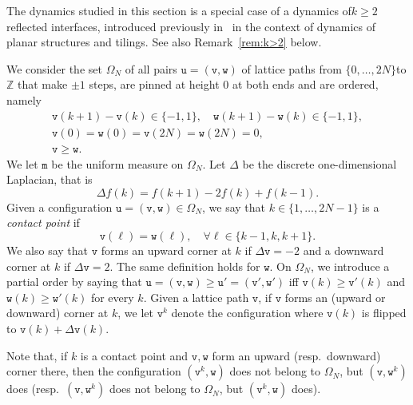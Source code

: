 \documentclass[AHL,Unicode,longabstracts]{cedram}
\theoremstyle{plain}
\newcommand{\ttv}{\mathtt{v}}
\newcommand{\ttw}{\mathtt{w}}
\newcommand{\ttu}{\mathtt{u}}
\newcommand{\ttm}{\mathtt{m}}
\newcommand{\tu}{\mathtt{u}}
\newcommand{\bbZ}{\mathbb{Z}}
\let\oldforall\forall
\renewcommand*{\forall}{\mathrel{\oldforall}}
\newcounter{setofstep}
\newcounter{step}[setofstep]
\begin{document}
The dynamics studied in this section is a special case of a dynamics of\linebreak $k\ge 2$ reflected interfaces, introduced previously in~\cite{luby2001markov,wilson2004mixing} in the context of dynamics of planar structures and tilings. See also Remark~\ref{rem:k>2} below.

We consider the set $\Omega_N$ of all pairs $\ttu=(\ttv,\ttw)$ of lattice paths from $\{0,\dots,2N\}$\linebreak to $\bbZ$ that make $\pm 1$ steps, are pinned at height $0$ at both ends and are ordered, namely
\begin{gather*}
\ttv(k+1)-\ttv(k) \in \{-1,1\},\quad \ttw(k+1)-\ttw(k) \in \{-1,1\},\\
\ttv(0)=\ttw(0)=\ttv(2N)=\ttw(2N) = 0,\\
\ttv \ge \ttw.
\end{gather*}
We let $\ttm$ be the uniform measure on $\Omega_N$. Let $\Delta$ be the discrete one-dimensional Laplacian, that is
\[
\Delta f(k) = f(k+1) - 2 f(k) + f(k-1).
\]
Given a configuration $\tu=(\ttv,\ttw) \in \Omega_N$, we say that $k\in\{1,\dots,2N-1\}$ is a \emph{contact point} if
\[
\ttv(\ell) = \ttw(\ell),\quad \forall \ell \in \{k-1,k,k+1\}.
\]
We also say that $\ttv$ forms an upward corner at $k$ if $\Delta \ttv = -2$ and a downward corner at $k$ if $\Delta \ttv = 2$. The same definition holds for $\ttw$. On $\Omega_N$, we introduce a partial order by saying that $\ttu=(\ttv,\ttw)\ge \ttu'=(\ttv',\ttw')$ iff $\ttv(k)\ge \ttv'(k)$ and $\ttw(k)\ge \ttw'(k)$ for every $k$. Given a lattice path $\ttv$, if $\ttv$ forms an (upward or downward) corner at $k$, we let $\ttv^k$ denote the configuration where $\ttv(k)$ is flipped to $\ttv(k)+\Delta \ttv(k)$.

Note that, if $k$ is a contact point and $\ttv,\ttw$ form an upward (resp.~downward) corner there, then the configuration $(\ttv^k,\ttw)$ does not belong to $\Omega_N$, but $(\ttv,\ttw^k)$ does (resp.~$(\ttv,\ttw^k)$ does not belong to $\Omega_N$, but $(\ttv^k,\ttw)$ does).
\end{document}
